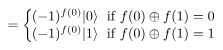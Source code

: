 \documentclass[preview]{standalone}
\begin{document}
\begin{align*}
= \left\{ \begin{array}{ll} \hspace{-2mm} (-1)^{f(0)} |0\rangle \; \text{ if } f(0) \oplus f(1) = 0 \\ \hspace{-2mm} (-1)^{f(0)} |1\rangle \; \text{ if } f(0) \oplus f(1) = 1 \end{array} \right.
\end{align*}
\end{document}
